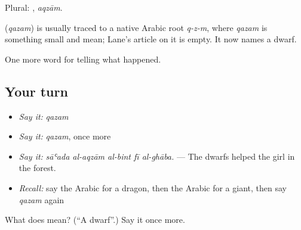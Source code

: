 Plural: , \emph{aqzām}.

\begin{cousinweb}
\textbf{} (\emph{qazam}) is usually traced to a native Arabic root \emph{q-z-m}, where \emph{qazam} is something small and mean; Lane's article on it is empty. It now names a dwarf.
\end{cousinweb}

\begin{grammarlens}[title={What you've built}]
One more word for telling what happened.
\end{grammarlens}

\subsection*{Your turn}
\begin{itemize}
\raggedright
  \item \emph{Say it:} \emph{qazam}
  \item \emph{Say it:} \emph{qazam}, once more
  \item \emph{Say it:} \emph{sāʿada al-aqzām al-bint fī al-ghāba.} — The dwarfs helped the girl in the forest.
  \item \emph{Recall:} say the Arabic for a dragon, then the Arabic for a giant, then say \emph{qazam} again
\end{itemize}

\begin{tcolorbox}[breakable,colback=teal!4,colframe=teal!35!black,title={Before you move on}]
What does  mean? (\textquotedblleft{}A dwarf\textquotedblright{}.) Say it once more.
\end{tcolorbox}
